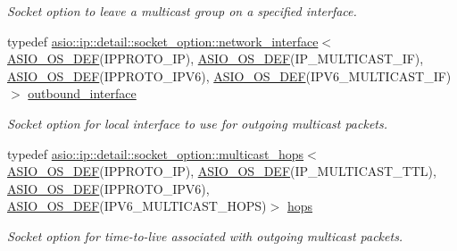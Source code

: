 \begin{DoxyCompactItemize}
\begin{DoxyCompactList}\small\item\em Socket option to leave a multicast group on a specified interface. \end{DoxyCompactList}\item 
typedef \hyperlink{classasio_1_1ip_1_1detail_1_1socket__option_1_1network__interface}{asio\+::ip\+::detail\+::socket\+\_\+option\+::network\+\_\+interface}$<$ \hyperlink{socket__types_8hpp_a26e0208fa086ac48cf5af1b2a521c74a}{A\+S\+I\+O\+\_\+\+O\+S\+\_\+\+D\+E\+F}(I\+P\+P\+R\+O\+T\+O\+\_\+\+I\+P), \hyperlink{socket__types_8hpp_a26e0208fa086ac48cf5af1b2a521c74a}{A\+S\+I\+O\+\_\+\+O\+S\+\_\+\+D\+E\+F}(I\+P\+\_\+\+M\+U\+L\+T\+I\+C\+A\+S\+T\+\_\+\+I\+F), \hyperlink{socket__types_8hpp_a26e0208fa086ac48cf5af1b2a521c74a}{A\+S\+I\+O\+\_\+\+O\+S\+\_\+\+D\+E\+F}(I\+P\+P\+R\+O\+T\+O\+\_\+\+I\+P\+V6), \hyperlink{socket__types_8hpp_a26e0208fa086ac48cf5af1b2a521c74a}{A\+S\+I\+O\+\_\+\+O\+S\+\_\+\+D\+E\+F}(I\+P\+V6\+\_\+\+M\+U\+L\+T\+I\+C\+A\+S\+T\+\_\+\+I\+F)$>$ \hyperlink{namespaceasio_1_1ip_1_1multicast_a0c7f18a8d8e3922c06d0d3894754b2f5}{outbound\+\_\+interface}
\begin{DoxyCompactList}\small\item\em Socket option for local interface to use for outgoing multicast packets. \end{DoxyCompactList}\item 
typedef \hyperlink{classasio_1_1ip_1_1detail_1_1socket__option_1_1multicast__hops}{asio\+::ip\+::detail\+::socket\+\_\+option\+::multicast\+\_\+hops}$<$ \hyperlink{socket__types_8hpp_a26e0208fa086ac48cf5af1b2a521c74a}{A\+S\+I\+O\+\_\+\+O\+S\+\_\+\+D\+E\+F}(I\+P\+P\+R\+O\+T\+O\+\_\+\+I\+P), \hyperlink{socket__types_8hpp_a26e0208fa086ac48cf5af1b2a521c74a}{A\+S\+I\+O\+\_\+\+O\+S\+\_\+\+D\+E\+F}(I\+P\+\_\+\+M\+U\+L\+T\+I\+C\+A\+S\+T\+\_\+\+T\+T\+L), \hyperlink{socket__types_8hpp_a26e0208fa086ac48cf5af1b2a521c74a}{A\+S\+I\+O\+\_\+\+O\+S\+\_\+\+D\+E\+F}(I\+P\+P\+R\+O\+T\+O\+\_\+\+I\+P\+V6), \hyperlink{socket__types_8hpp_a26e0208fa086ac48cf5af1b2a521c74a}{A\+S\+I\+O\+\_\+\+O\+S\+\_\+\+D\+E\+F}(I\+P\+V6\+\_\+\+M\+U\+L\+T\+I\+C\+A\+S\+T\+\_\+\+H\+O\+P\+S)$>$ \hyperlink{namespaceasio_1_1ip_1_1multicast_a9fb457c6f8978841b954fc752c04563f}{hops}
\begin{DoxyCompactList}\small\item\em Socket option for time-\/to-\/live associated with outgoing multicast packets. \end{DoxyCompactList}\item 

\end{DoxyCompactItemize}
